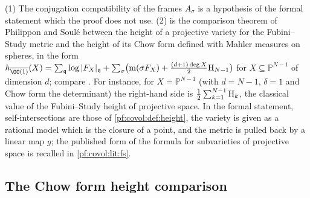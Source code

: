 \begin{remark}\label{pf:covol:rem:classical}
(1) The conjugation compatibility of the frames $A_\sigma$ is a hypothesis of the formal statement which
the proof does not use.
(2)  is the comparison theorem of Philippon and Soul\'e
\cite{Philippon1991,Soule1991} between the height of a projective variety for the Fubini--Study metric
and the height of its Chow form defined with Mahler measures on spheres, in the form
$h_{\overline{\OO(1)}}(X)=\sum_{\mathfrak q}\log|F_X|_{\mathfrak q}+\sum_\sigma\bigl(\covolMah(\sigma F_X)+
\frac{(d+1)\deg X}2\covolHar_{N-1}\bigr)$ for $X\subseteq\mathbb P^{N-1}$ of dimension $d$; compare
\cite[\S4.3]{BostGilletSoule1994}. For instance, for $X=\mathbb P^{N-1}$ (with $d=N-1$, $\delta=1$ and Chow form
the determinant) the right-hand side is $\frac12\sum_{k=1}^{N-1}\mathrm{H}_k$, the classical value of the
Fubini--Study height of projective space. In the formal statement, self-intersections are those of
\cref{pf:covol:def:height}, the variety is given as a rational model which is the closure of a point, and
the metric is pulled back by a linear map $g$; the published form of the formula for subvarieties of
projective space is recalled in \cref{pf:covol:lit:fs}.
\end{remark}

\subsection{The Chow form height comparison}\label{sec:pf:covol:comparison}

